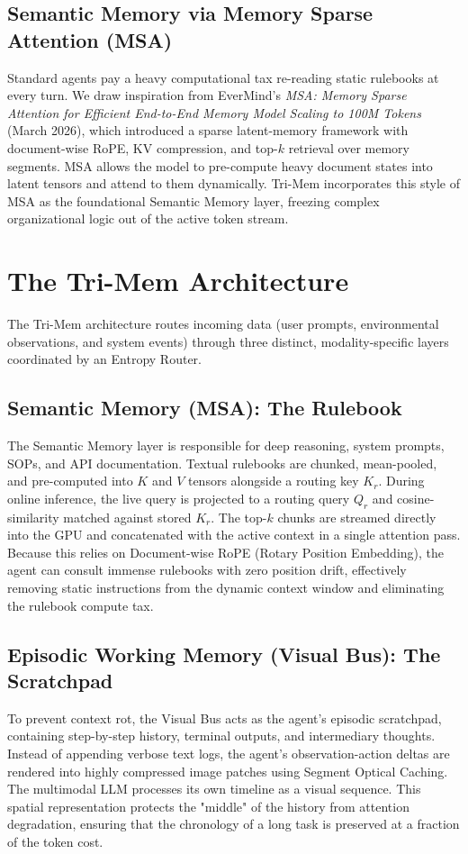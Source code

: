 \documentclass[conference]{IEEEtran}
\begin{document}
\subsection{Semantic Memory via Memory Sparse Attention (MSA)}
Standard agents pay a heavy computational tax re-reading static rulebooks at every turn. We draw inspiration from EverMind's \textit{MSA: Memory Sparse Attention for Efficient End-to-End Memory Model Scaling to 100M Tokens} (March 2026), which introduced a sparse latent-memory framework with document-wise RoPE, KV compression, and top-$k$ retrieval over memory segments. MSA allows the model to pre-compute heavy document states into latent tensors and attend to them dynamically. Tri-Mem incorporates this style of MSA as the foundational Semantic Memory layer, freezing complex organizational logic out of the active token stream.

\section{The Tri-Mem Architecture}

The Tri-Mem architecture routes incoming data (user prompts, environmental observations, and system events) through three distinct, modality-specific layers coordinated by an Entropy Router.

\subsection{Semantic Memory (MSA): The Rulebook}
The Semantic Memory layer is responsible for deep reasoning, system prompts, SOPs, and API documentation. Textual rulebooks are chunked, mean-pooled, and pre-computed into $K$ and $V$ tensors alongside a routing key $K_r$. During online inference, the live query is projected to a routing query $Q_r$ and cosine-similarity matched against stored $K_r$. The top-$k$ chunks are streamed directly into the GPU and concatenated with the active context in a single attention pass. Because this relies on Document-wise RoPE (Rotary Position Embedding), the agent can consult immense rulebooks with zero position drift, effectively removing static instructions from the dynamic context window and eliminating the rulebook compute tax.

\subsection{Episodic Working Memory (Visual Bus): The Scratchpad}
To prevent context rot, the Visual Bus acts as the agent's episodic scratchpad, containing step-by-step history, terminal outputs, and intermediary thoughts. Instead of appending verbose text logs, the agent's observation-action deltas are rendered into highly compressed image patches using Segment Optical Caching. The multimodal LLM processes its own timeline as a visual sequence. This spatial representation protects the "middle" of the history from attention degradation, ensuring that the chronology of a long task is preserved at a fraction of the token cost.
\end{document}
